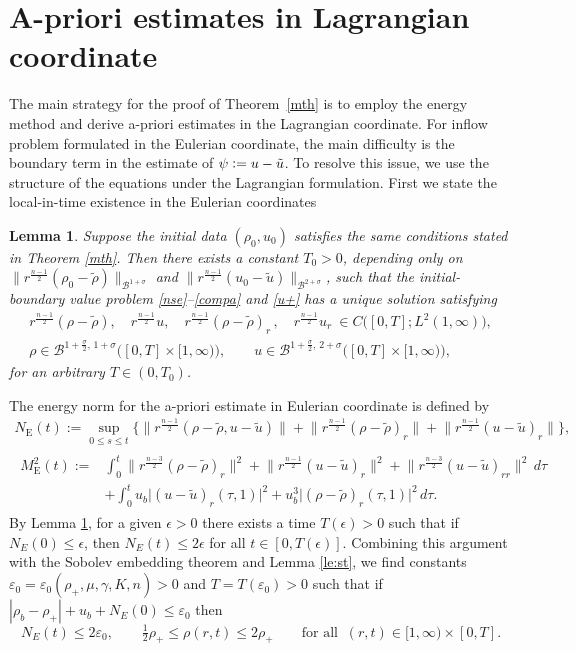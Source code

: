 \documentclass[a4paper,12pt,draft]{article}
\newtheorem{lemma}[theorem]{Lemma}
\theoremstyle{remark}
\def\ut{\tilde{u}}
\def\rt{\tilde{\rho}}
\def\ep{\varepsilon}
\newcommand{\qu}{\quad}
\begin{document}
\section{A-priori estimates in Lagrangian coordinate}\label{sec:prioriE}
The main strategy for the proof of Theorem~\ref{mth} is to employ the energy method and derive a-priori estimates in the Lagrangian coordinate. For inflow problem formulated in the Eulerian coordinate, the main difficulty is the boundary term in the estimate of $\psi\vcentcolon=u-\ut$. To resolve this issue, we use the structure of the equations under the Lagrangian formulation. First we state the local-in-time existence in the Eulerian coordinates
\begin{lemma}\label{lm:local}
    Suppose the initial data $(\rho_0,u_0)$ satisfies the same conditions stated in Theorem \ref{mth}. Then there exists a constant $T_0>0$, depending only on $\| r^{\frac{n-1}{2}} (\rho_0-\rt) \|_{\mathcal{B}^{1+\sigma}}$ and $\| r^{\frac{n-1}{2}} (u_0-\ut) \|_{\mathcal{B}^{2+\sigma}}$, such that the initial-boundary value problem \eqref{nse}--\eqref{compa} and \eqref{u+} has a unique solution satisfying 
    \begin{gather*}
        r^{\frac{n-1}{2}} (\rho-\rt ), \qu r^{\frac{n-1}{2}} u, \qu r^{\frac{n-1}{2}} (\rho-\rt)_r\,, \qu r^{\frac{n-1}{2}} u_r \ \in C\big([0,T]; L^2(1,\infty)\big),\\
        \rho \in \mathcal{B}^{1+\frac{\sigma}{2},\, 1+\sigma}\big([0,T]\times[1,\infty)\big), \qquad u\in \mathcal{B}^{1+\frac{\sigma}{2},\, 2+\sigma}\big([0,T]\times[1,\infty)\big),
    \end{gather*}
    for an arbitrary $T\in (0,T_0)$.
\end{lemma}

The energy norm for the a-priori estimate in Eulerian coordinate is defined by
\begin{gather}
    N_{\textrm{E}}(t) := \sup\limits_{0\le s \le t} \Big\{ \big\| r^{\frac{n-1}{2}}(\rho-\rt,u-\ut) \big\| + \big\| r^{\frac{n-1}{2}}(\rho-\rt)_r \big\| + \big\| r^{\frac{n-1}{2}}(u-\ut)_r \big\| \Big\},\label{NE}\\
    \begin{aligned}
        M_{\textrm{E}}^2(t) :=& \int_{0}^{t}\!\!  \big\| r^{\frac{n-3}{2}}(\rho-\rt)_r \big\|^2 + \big\| r^{\frac{n-1}{2}}(u-\ut)_r \big\|^2 + \big\| r^{\frac{n-3}{2}} (u-\ut)_{rr} \big\|^2\,  d\tau \\ &+ \int_{0}^{t} u_b\big|(u-\ut)_r(\tau,1)\big|^2 + u_b^3\big|(\rho-\rt)_r(\tau,1)\big|^2\, d\tau.
    \end{aligned}\label{ME}
\end{gather}
By Lemma \ref{lm:local}, for a given $\epsilon>0$ there exists a time $T(\epsilon)>0$ such that if $N_{E}(0) \le \epsilon$, then $N_{E}(t)\le 2\epsilon$ for all $t\in[0,T(\epsilon)]$. Combining this argument with the Sobolev embedding theorem and Lemma \ref{le:st}, we find constants $\ep_0=\ep_0(\rho_+,\mu,\gamma,K,n)>0$ and $T=T(\ep_0)>0$ such that if $|\rho_b-\rho_+| + u_b + N_{E}(0) \le \ep_0$ then 
\begin{equation}\label{priori-Rho}
    N_{E}(t)\le 2\ep_0, \qquad \tfrac{1}{2}\rho_{+} \le \rho(r,t) \le 2 \rho_+ \qquad \text{for all } \ (r,t)\in [1,\infty)\times[0,T].
\end{equation}
\end{document}
